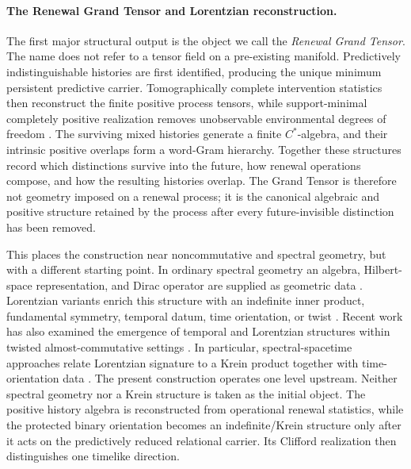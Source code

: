 \documentclass[11pt]{article}
\numberwithin{equation}{section}
\theoremstyle{definition}
\theoremstyle{remark}
\begin{document}
\paragraph{The Renewal Grand Tensor and Lorentzian reconstruction.}
The first major structural output is the object we call the
\emph{Renewal Grand Tensor}.  The name does not refer to a tensor field on a
pre-existing manifold.  Predictively indistinguishable histories are first
identified, producing the unique minimum persistent predictive carrier.
Tomographically complete intervention statistics then reconstruct the finite
positive process tensors, while support-minimal completely positive
realization removes unobservable environmental degrees of freedom
\cite{Stinespring1955,Choi1975}.  The surviving mixed histories generate a
finite $C^*$-algebra, and their intrinsic positive overlaps form a word-Gram
hierarchy.  Together these structures record which distinctions survive into
the future, how renewal operations compose, and how the resulting histories
overlap.  The Grand Tensor is therefore not geometry imposed on a renewal
process; it is the canonical algebraic and positive structure retained by the
process after every future-invisible distinction has been removed.

This places the construction near noncommutative and spectral geometry, but
with a different starting point.  In ordinary spectral geometry an algebra,
Hilbert-space representation, and Dirac operator are supplied as geometric
data \cite{Connes1994}.  Lorentzian variants enrich this structure with an
indefinite inner product, fundamental symmetry, temporal datum, time
orientation, or twist
\cite{strohmaier,franco,franco-eckstein,
vandendungenpaschkerennie2013,vandendungen2016,BesnardBizi2018,
DevastatoFarnsworthLizziMartinetti2018,
DevastatoFilaciMartinettiSingh2020}.  Recent work has also examined the
emergence of temporal and Lorentzian structures within twisted
almost-commutative settings \cite{nieuviarts2026a,nieuviarts2026b}.  In
particular, spectral-spacetime approaches relate Lorentzian signature to a
Krein product together with time-orientation data \cite{BesnardBizi2018}.  The
present construction operates one level upstream.  Neither spectral geometry
nor a Krein structure is taken as the initial object.  The positive history
algebra is reconstructed from operational renewal statistics, while the
protected binary orientation becomes an indefinite/Krein structure only after
it acts on the predictively reduced relational carrier.  Its Clifford
realization then distinguishes one timelike direction.
\end{document}
